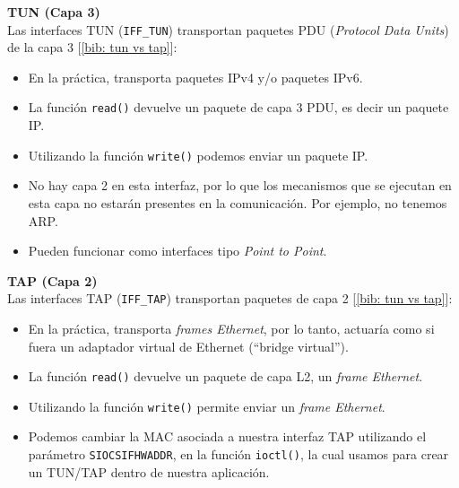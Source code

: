 \documentclass[12pt]{article}
\begin{document}
	\vspace{5px}

	\noindent \textbf{\large TUN (Capa 3)}\\
	
	\noindent Las interfaces TUN (\texttt{IFF\_TUN}) transportan paquetes PDU (\textit{Protocol Data Units}) de la capa 3 [\ref{bib: tun vs tap}]:
	\begin{itemize}
		\item En la práctica, transporta paquetes IPv4 y/o paquetes IPv6.
		\item La función \texttt{read()} devuelve un paquete de capa 3 PDU, es decir un paquete IP.
		\item Utilizando la función \texttt{write()} podemos enviar un paquete IP.
		\item No hay capa 2 en esta interfaz, por lo que los mecanismos que se ejecutan en esta capa no estarán presentes en la comunicación. Por ejemplo, no tenemos ARP.
		\item Pueden funcionar como interfaces tipo \textit{Point to Point}.
	\end{itemize}
	
	\pagebreak
	
	\noindent \textbf{\large TAP (Capa 2)}\\
	
	\noindent Las interfaces TAP (\texttt{IFF\_TAP}) transportan paquetes de capa 2 [\ref{bib: tun vs tap}]: 
	\begin{itemize}
		\item En la práctica, transporta \textit{frames Ethernet}, por lo tanto, actuaría como si fuera un adaptador virtual de Ethernet (``bridge virtual'').
		\item La función \texttt{read()} devuelve un paquete de capa L2, un \textit{frame Ethernet}.
		\item Utilizando la función \texttt{write()} permite enviar un \textit{frame Ethernet}.
		\item Podemos cambiar la MAC asociada a nuestra interfaz TAP utilizando el parámetro \texttt{SIOCSIFHWADDR}, en la función \texttt{ioctl()}, la cual usamos para crear un TUN/TAP dentro de nuestra aplicación.
	\end{itemize}

	\vspace{5px}
\end{document}
